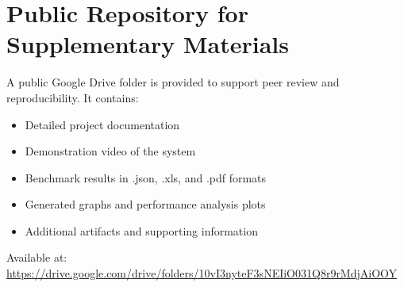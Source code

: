 \documentclass[conference]{IEEEtran}
\begin{document}
                \section{Public Repository for Supplementary Materials}
                A public Google Drive folder is provided to support peer review and reproducibility. It contains:
                \begin{itemize}
                    \item Detailed project documentation
                    \item Demonstration video of the system
                    \item Benchmark results in .json, .xls, and .pdf formats
                    \item Generated graphs and performance analysis plots
                    \item Additional artifacts and supporting information
                \end{itemize}
                Available at: \url{https://drive.google.com/drive/folders/10vI3nyteF3sNEIiO031Q8r9rMdjAiOOY}
                
                
\end{document}

